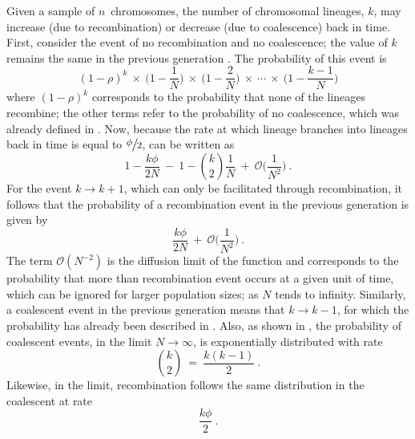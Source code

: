 Given a sample of $n$~chromosomes, the number of chromosomal lineages, $k$, may increase (due to recombination) or decrease (due to coalescence) back in time.
First, consider the event of no recombination and no coalescence; \ie the value of $k$ remains the same in the previous generation \citep[\eg, see][]{tavare2004}.
The probability of this event is
\begin{equation}\label{eq:coalrec_dont1}
	(1-\rho)^k~\times~\Big(1-\frac{1}{N} \Big)~\times~\Big(1-\frac{2}{N}\Big)~\times~\cdots~\times~\Big(1-\frac{k-1}{N}\Big)
\end{equation}
where ${(1 - \rho)^k}$ corresponds to the probability that none of the lineages recombine; the other terms refer to the probability of no coalescence, which was already defined in .
Now, because the rate at which  lineage branches into  lineages back in time is equal to $\large \sfrac{\phi}{2}$,  can be written as
\begin{equation}\label{eq:coalrec_dont2}
	1-\frac{k\phi}{2N}~-~1-{k \choose 2}\frac{1}{N}~+~\mathcal{O}\Big(\frac{1}{N^2}\Big)
	\ \text{.}
\end{equation}
For the event ${k\rightarrow k+1}$, which can only be facilitated through recombination, it follows that the probability of a recombination event in the previous generation is given by
\begin{equation}
	\frac{k\phi}{2N}~+~\mathcal{O}\Big(\frac{1}{N^2}\Big)
	\ \text{.}
\end{equation}
The term ${\mathcal{O}(N^{-2})}$ is the diffusion limit of the function and corresponds to the probability that more than  recombination event occurs at a given unit of time, which can be ignored for larger population sizes; \ie as $N$ tends to infinity.
Similarly, a coalescent event in the previous generation means that ${k \rightarrow k-1}$, for which the probability has already been described in .
Also, as shown in , the probability of coalescent events, in the limit ${N\rightarrow\infty}$, is exponentially distributed with rate
\begin{equation}
	{k\choose 2}~=~\frac{k(k-1)}{2}
	\ \text{.}
\end{equation}
Likewise, in the limit, recombination follows the same distribution in the coalescent at rate
\begin{equation}
	\frac{k\phi}{2}
	\ \text{.}
\end{equation}

